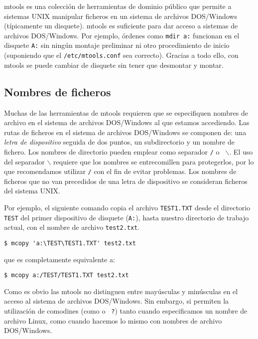{\sf mtools} es  una colección de herramientas de  dominio público que
permite a sistemas  UNIX manipular ficheros en un  sistema de archivos
DOS/Windows (típicamente un disquete). {\sf mtools} es suficiente para
dar acceso  a sistemas de  archivos DOS/Windows. Por  ejemplo, órdenes
como  {\tt mdir  a:}  funcionan en  el disquete  {\tt  A:} sin  ningún
montaje preliminar ni otro procedimiento  de inicio (suponiendo que el
{\tt /etc/mtools.conf}  sea correcto). Gracias  a todo ello,  con {\sf
mtools} se puede cambiar de disquete sin tener que desmontar y montar.

\subsection{Nombres de ficheros}

Muchas  de  las   herramientas  de  {\sf  mtools}   requieren  que  se
especifiquen nombres de archivo en  el sistema de archivos DOS/Windows
al que  estamos accediendo.  Las rutas  de ficheros  en el  sistema de
archivos DOS/Windows  se componen de:  una {\em letra  de dispositivo}
seguida de  dos puntos, un subdirectorio  y un nombre de  fichero. Los
nombres de  directorio pueden  emplear como separador  {\tt /}  o {\tt
$\backslash$}. El  uso del  separador {\tt $\backslash$}  requiere que
los nombres se entrecomillen para protegerlos, por lo que recomendamos
utilizar  {\tt /}  con  el fin  de evitar  problemas.  Los nombres  de
ficheros  que  no  van  precedidos  de una  letra  de  dispositivo  se
consideran ficheros del sistema UNIX.

Por ejemplo,  el siguiente  comando copia  el archivo  {\tt TEST1.TXT}
desde  el directorio  {\tt TEST}  del primer  dispositivo de  disquete
({\tt A:}), hasta nuestro directorio  de trabajo actual, con el nombre
de archivo {\tt test2.txt}.\label{mcopyej}

\begin{verbatim}
$ mcopy 'a:\TEST\TEST1.TXT' test2.txt
\end{verbatim}

que es completamente equivalente a:

\begin{verbatim}
$ mcopy a:/TEST/TEST1.TXT test2.txt
\end{verbatim}

Como  es obvio  las  {\sf  mtools} no  distinguen  entre mayúsculas  y
minúsculas  en  el acceso  al  sistema  de archivos  DOS/Windows.  Sin
embargo, si permiten la utilización de  comodines (como {\tt *} o {\tt
?}) tanto cuando especificamos un nombre de archivo Linux, como cuando
hacemos lo mismo con nombres de archivo DOS/Windows.

